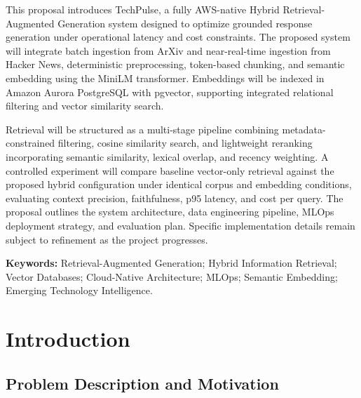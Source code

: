 \documentclass[12pt,a4paper]{report}
\begin{document}
This proposal introduces TechPulse, a fully AWS-native Hybrid Retrieval-Augmented Generation system designed to optimize grounded response generation under operational latency and cost constraints. The proposed system will integrate batch ingestion from ArXiv and near-real-time ingestion from Hacker News, deterministic preprocessing, token-based chunking, and semantic embedding using the MiniLM transformer. Embeddings will be indexed in Amazon Aurora PostgreSQL with pgvector, supporting integrated relational filtering and vector similarity search.

Retrieval will be structured as a multi-stage pipeline combining metadata-constrained filtering, cosine similarity search, and lightweight reranking incorporating semantic similarity, lexical overlap, and recency weighting. A controlled experiment will compare baseline vector-only retrieval against the proposed hybrid configuration under identical corpus and embedding conditions, evaluating context precision, faithfulness, p95 latency, and cost per query. The proposal outlines the system architecture, data engineering pipeline, MLOps deployment strategy, and evaluation plan. Specific implementation details remain subject to refinement as the project progresses.

\medskip
\noindent\textbf{Keywords:} Retrieval-Augmented Generation; Hybrid Information Retrieval; Vector Databases; Cloud-Native Architecture; MLOps; Semantic Embedding; Emerging Technology Intelligence.

\newpage\tableofcontents
\newpage{}\listoftables
\newpage{}\listoffigures

\newpage
{}

\chapter{Introduction}

\section{Problem Description and Motivation}
\label{sec:problem}
\end{document}
